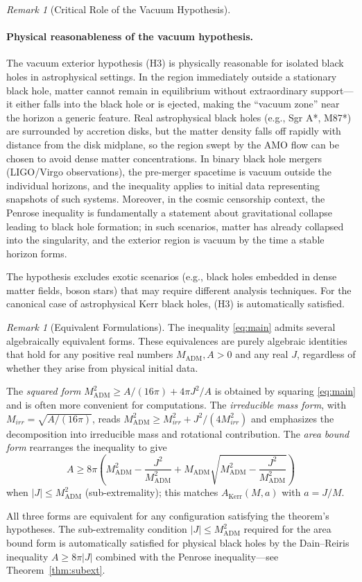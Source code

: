 \documentclass[12pt]{article}
\theoremstyle{plain}
\theoremstyle{definition}
\theoremstyle{remark}
\newtheorem{remark}[theorem]{Remark}
\newcommand{\ADM}{\mathrm{ADM}}
\begin{document}
\begin{remark}[Critical Role of the Vacuum Hypothesis]
\paragraph{Physical reasonableness of the vacuum hypothesis.}
The vacuum exterior hypothesis (H3) is physically reasonable for isolated black holes in astrophysical settings. In the region immediately outside a stationary black hole, matter cannot remain in equilibrium without extraordinary support---it either falls into the black hole or is ejected, making the ``vacuum zone'' near the horizon a generic feature. Real astrophysical black holes (e.g., Sgr A*, M87*) are surrounded by accretion disks, but the matter density falls off rapidly with distance from the disk midplane, so the region swept by the AMO flow can be chosen to avoid dense matter concentrations. In binary black hole mergers (LIGO/Virgo observations), the pre-merger spacetime is vacuum outside the individual horizons, and the inequality applies to initial data representing snapshots of such systems. Moreover, in the cosmic censorship context, the Penrose inequality is fundamentally a statement about gravitational collapse leading to black hole formation; in such scenarios, matter has already collapsed into the singularity, and the exterior region is vacuum by the time a stable horizon forms.

The hypothesis excludes exotic scenarios (e.g., black holes embedded in dense matter fields, boson stars) that may require different analysis techniques. For the canonical case of astrophysical Kerr black holes, (H3) is automatically satisfied.
\end{remark}

\begin{remark}[Equivalent Formulations]\label{rem:equivalent-forms}
The inequality \eqref{eq:main} admits several algebraically equivalent forms. These equivalences are purely algebraic identities that hold for any positive real numbers $M_{\ADM}, A > 0$ and any real $J$, regardless of whether they arise from physical initial data.

The \emph{squared form} $M_{\ADM}^2 \geq A/(16\pi) + 4\pi J^2/A$ is obtained by squaring \eqref{eq:main} and is often more convenient for computations. The \emph{irreducible mass form}, with $M_{irr} = \sqrt{A/(16\pi)}$, reads $M_{\ADM}^2 \geq M_{irr}^2 + J^2/(4M_{irr}^2)$ and emphasizes the decomposition into irreducible mass and rotational contribution. The \emph{area bound form} rearranges the inequality to give 
\[
A \geq 8\pi\left(M_{\ADM}^2 - \frac{J^2}{M_{\ADM}^2} + M_{\ADM}\sqrt{M_{\ADM}^2 - \frac{J^2}{M_{\ADM}^2}}\right)
\]
when $|J| \leq M_{\ADM}^2$ (sub-extremality); this matches $A_{\text{Kerr}}(M, a)$ with $a = J/M$.

All three forms are equivalent for any configuration satisfying the theorem's hypotheses. The sub-extremality condition $|J| \leq M_{\ADM}^2$ required for the area bound form is automatically satisfied for physical black holes by the Dain--Reiris inequality $A \geq 8\pi|J|$ combined with the Penrose inequality---see Theorem~\ref{thm:subext}.
\end{remark}
\end{document}
